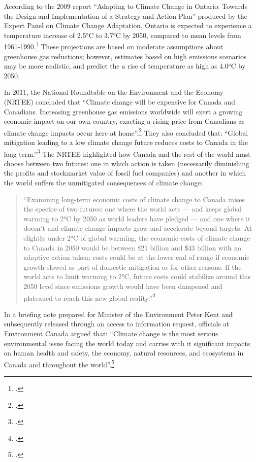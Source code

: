 According to the 2009 report ``Adapting to Climate Change in Ontario: Towards the Design and Implementation of a Strategy and Action Plan'' produced by the Expert Panel on Climate Change Adaptation, Ontario is expected to experience a temperature increase of 2.5°C to 3.7°C by 2050, compared to mean levels from 1961-1990.\footcite[][p. 15]{ExpertPanelAdapting2009}
These projections are based on moderate assumptions about greenhouse gas reductions; however, estimates based on high emissions scenarios may be more realistic, and predict the a rise of temperature as high as 4.0°C by 2050.



In 2011, the National Roundtable on the Environment and the Economy (NRTEE) concluded that ``Climate change will be expensive for Canada and Canadians. Increasing greenhouse gas emissions worldwide will exert a growing economic impact on our own country, exacting a rising price from Canadians as climate change impacts occur here at home''.\footcite[][p.15]{NRTEEPrice}
They also concluded that: ``Global mitigation leading to a low climate change future reduces costs to Canada in the long term.''\footcite[][p.16]{NRTEEPrice}
The NRTEE highlighted how Canada and the rest of the world must choose between two futures: one in which action is taken (necessarily diminishing the profits and stockmarket value of fossil fuel companies) and another in which the world suffers the unmitigated consequences of climate change:
\begin{quote}
``Examining long-term economic costs of climate change to Canada raises the spectre of two futures: one where the world acts — and keeps global warming to 2°C by 2050 as world leaders have pledged — and one where it doesn't and climate change impacts grow and accelerate beyond targets. At slightly under 2°C of global warming, the economic costs of climate change to Canada in 2050 would be between \$21 billion and \$43 billion with no adaptive action taken; costs could be at the lower end of range if economic growth slowed as part of domestic mitigation or for other reasons. If the world acts to limit warming to 2°C, future costs could stabilize around this 2050 level since emissions growth would have been dampened and plateaued to reach this new global reality.''\footcite[][p.18]{NRTEEPrice}
\end{quote}
In a briefing note prepared for Minister of the Environment Peter Kent and subsequently released through an access to information request, officials at Environment Canada argued that: ``Climate change is the most serious environmental issue facing the world today and carries with it significant impacts on human health and safety, the economy, natural resources, and ecosystems in Canada and throughout the world''.\footcite[][]{BureaucratsUrged}



